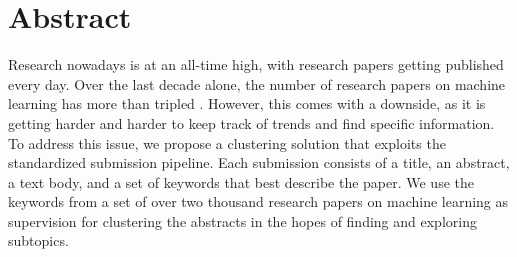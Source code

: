 \section*{Abstract}
Research nowadays is at an all-time high, with research papers getting published every day.
Over the last decade alone, the number of research papers on machine learning has more than tripled \cite{dimensions}.
However, this comes with a downside, as it is getting harder and harder to keep track of trends and find specific information.
To address this issue, we propose a clustering solution that exploits the standardized submission pipeline.
Each submission consists of a title, an abstract, a text body, and a set of keywords that best describe the paper.
We use the keywords from a set of over two thousand research papers on machine learning as supervision for clustering the abstracts in the hopes of finding and exploring subtopics.